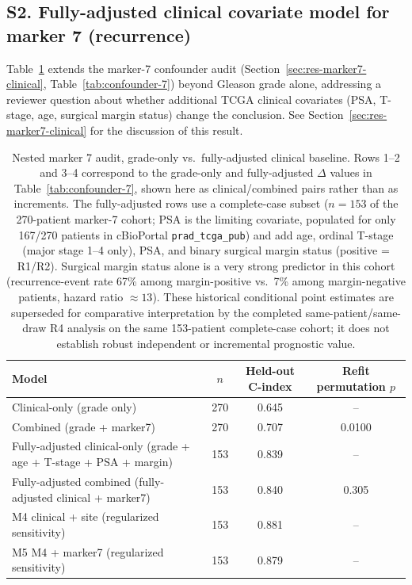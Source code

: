 \subsection*{S2. Fully-adjusted clinical covariate model for marker 7 (recurrence)}

Table~\ref{tab:supp-marker7-clinical} extends the marker-7 confounder audit
(Section~\ref{sec:res-marker7-clinical}, Table~\ref{tab:confounder-7}) beyond Gleason grade
alone, addressing a reviewer question about whether additional TCGA clinical covariates (PSA,
T-stage, age, surgical margin status) change the conclusion. See Section~\ref{sec:res-marker7-clinical}
for the discussion of this result.

\begin{table}[htbp]
\centering
\small
\begin{tabular}{p{7.2cm}ccc}
\toprule
Model & $n$ & Held-out C-index & Refit permutation $p$ \\
\midrule
Clinical-only (grade only) & 270 & 0.645 & -- \\
Combined (grade + marker7) & 270 & 0.707 & 0.0100 \\
Fully-adjusted clinical-only (grade + age + T-stage + PSA + margin) & 153 & 0.839 & -- \\
Fully-adjusted combined (fully-adjusted clinical + marker7) & 153 & 0.840 & 0.305 \\
M4 clinical + site (regularized sensitivity) & 153 & 0.881 & -- \\
M5 M4 + marker7 (regularized sensitivity) & 153 & 0.879 & -- \\
\bottomrule
\end{tabular}
\caption{Nested marker 7 audit, grade-only vs.\ fully-adjusted clinical baseline. Rows 1--2 and
3--4 correspond to the grade-only and fully-adjusted $\Delta$ values in
Table~\ref{tab:confounder-7}, shown here as clinical/combined pairs rather than as increments.
The fully-adjusted rows use a
complete-case subset ($n=153$ of the 270-patient marker-7 cohort; PSA is the limiting
covariate, populated for only 167/270 patients in cBioPortal \texttt{prad\_tcga\_pub}) and add
age, ordinal T-stage (major stage 1--4 only), PSA, and binary surgical margin status
(positive = R1/R2). Surgical margin status alone is a very strong predictor in this cohort
(recurrence-event rate 67\% among margin-positive vs.\ 7\% among margin-negative patients,
hazard ratio $\approx 13$). These historical conditional point estimates are superseded for
comparative interpretation by the completed same-patient/same-draw R4 analysis on the same
153-patient complete-case cohort; it does not establish robust independent or incremental
prognostic value.}
\label{tab:supp-marker7-clinical}
\end{table}

